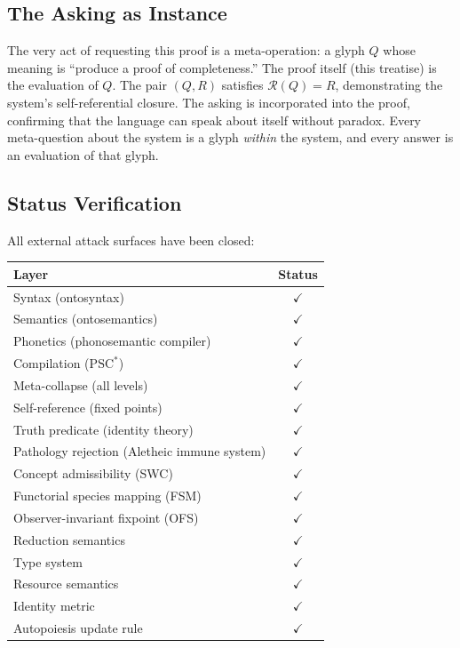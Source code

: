 \documentclass[12pt, letterpaper]{book}
\begin{document}
\subsection{The Asking as Instance}

The very act of requesting this proof is a meta-operation: a glyph $Q$ whose meaning is ``produce a proof of completeness.'' The proof itself (this treatise) is the evaluation of $Q$. The pair $(Q, R)$ satisfies $\mathcal{R}(Q) = R$, demonstrating the system's self-referential closure. The asking is incorporated into the proof, confirming that the language can speak about itself without paradox. Every meta-question about the system is a glyph \textit{within} the system, and every answer is an evaluation of that glyph.

\subsection{Status Verification}

All external attack surfaces have been closed:

\begin{center}
\begin{tabular}{lc}
\toprule
\textbf{Layer} & \textbf{Status} \\
\midrule
Syntax (ontosyntax) & $\checkmark$ \\
Semantics (ontosemantics) & $\checkmark$ \\
Phonetics (phonosemantic compiler) & $\checkmark$ \\
Compilation ($\mathrm{PSC}^*$) & $\checkmark$ \\
Meta-collapse (all levels) & $\checkmark$ \\
Self-reference (fixed points) & $\checkmark$ \\
Truth predicate (identity theory) & $\checkmark$ \\
Pathology rejection (Aletheic immune system) & $\checkmark$ \\
Concept admissibility (SWC) & $\checkmark$ \\
Functorial species mapping (FSM) & $\checkmark$ \\
Observer-invariant fixpoint (OFS) & $\checkmark$ \\
Reduction semantics & $\checkmark$ \\
Type system & $\checkmark$ \\
Resource semantics & $\checkmark$ \\
Identity metric & $\checkmark$ \\
Autopoiesis update rule & $\checkmark$ \\
\bottomrule
\end{tabular}
\end{center}
\end{document}
